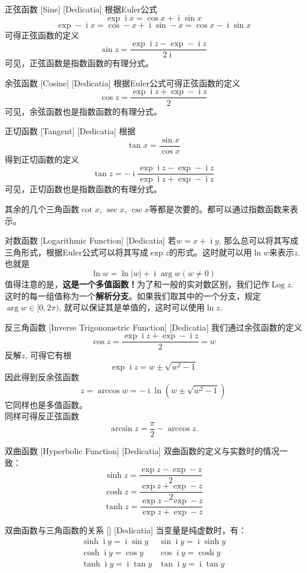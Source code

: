 \documentclass[UTF8]{ctexart}
\DeclareMathOperator{\ii}{\mathrm{i}}
\DeclareMathOperator{\Log}{Log}
\begin{document}
\begin{dfn}
    [UUID]
    {正弦函数}
    [Sine]
    [Dedicatia]
    根据Euler公式
    \[\exp \ii x=\cos x+\ii\sin x\]
    \[\exp -\ii x=\cos -x+\ii\sin -x=\cos x-\ii\sin x\]
    可得正弦函数的定义
    \[\sin z=\frac{\exp\ii z-\exp -\ii z}{2\ii}\]
    可见，正弦函数是指数函数的有理分式。
\end{dfn}
\begin{dfn}
    [UUID]
    {余弦函数}
    [Cosine]
    [Dedicatia]
    根据Euler公式可得正弦函数的定义
    \[\cos z=\frac{\exp\ii z+\exp -\ii z}{2}\]
    可见，余弦函数也是指数函数的有理分式。
\end{dfn}
\begin{dfn}
    [UUID]
    {正切函数}
    [Tangent]
    [Dedicatia]
    根据
    \[\tan x=\frac{\sin x}{\cos x}\]
    得到正切函数的定义
    \[\tan z=-\ii\frac{\exp \ii z-\exp -\ii z}{\exp \ii z+\exp -\ii z}\]
    可见，正切函数也是指数函数的有理分式。
\end{dfn}
其余的几个三角函数$\cot x$, $\sec x$, $\csc x$等都是次要的。都可以通过指数函数来表示。
\begin{dfn}
    [UUID]
    {对数函数}
    [Logarithmic Function]
    [Dedicatia]
    若$w=x+\ii y$, 那么总可以将其写成三角形式，根据Euler公式可以将其写成$\exp z$的形式。这时就可以用$\ln w$来表示$z$. 也就是
    \[\ln w=\ln|w|+\ii\arg w (w\neq 0)\]
    值得注意的是，\textbf{这是一个多值函数！}为了和一般的实对数区别，我们记作$\Log z$. 这时的每一组值称为一个\textbf{解析分支}。如果我们取其中的一个分支，规定$\arg w\in[0,2\pi)$, 就可以保证其是单值的，这时可以使用$\ln z$.
\end{dfn}
\begin{dfn}
    [UUID]
    {反三角函数}
    [Inverse Trigonometric Function]
    [Dedicatia]
    我们通过余弦函数的定义
    \[\cos z=\frac{\exp\ii z+\exp -\ii z}{2}=w\]
    反解$z$, 可得它有根
    \[\exp\ii z=w\pm\sqrt{w^2-1}\]
    因此得到反余弦函数
    \[z=\arccos w=-\ii\ln(w\pm\sqrt{w^2-1})\]
    它同样也是多值函数。\\
    同样可得反正弦函数
    \[\arcsin z=\frac{\pi}{2}-\arccos z.\]
\end{dfn}
\begin{dfn}
    [UUID]
    {双曲函数}
    [Hyperbolic Function]
    [Dedicatia]
    双曲函数的定义与实数时的情况一致：
    \[\sinh z=\frac{\exp z-\exp -z}{2}\]
    \[\cosh z=\frac{\exp z+\exp -z}{2}\]
    \[\tanh z=\frac{\exp z-\exp -z}{\exp z+\exp -z}\]
\end{dfn}
\begin{ppt}
    [UUID]
    {双曲函数与三角函数的关系}
    []
    [Dedicatia]
    当变量是纯虚数时，有：
    \[\begin{array}{cc}
        \sinh\ii y=\ii\sin y&\sin\ii y=\ii\sinh y\\
        \cosh\ii y=\cos y&\cos\ii y=\cosh y\\
        \tanh\ii y=\ii\tan y&\tan\ii y=\ii\tan y
    \end{array}\]
\end{ppt}
\end{document}
